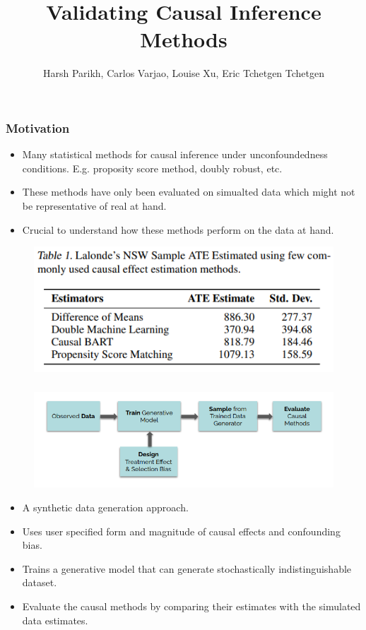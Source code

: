 \documentclass{beamer}
\begin{document}
\title[]{Validating Causal Inference Methods}
\author [] {Harsh Parikh, Carlos Varjao, Louise Xu, Eric Tchetgen Tchetgen}
\date{}
\maketitle

\begin{frame}
	\frametitle{Motivation}
	\begin{itemize}
		\item Many statistical methods for causal inference under unconfoundedness conditions. E.g. proposity score method, doubly robust, etc.
		\item These methods have only been evaluated on simualted data which might not be representative of real at hand.
		\item Crucial to understand how these methods perform on the data at hand.
	\end{itemize}
	\begin{figure}
		\includegraphics[scale=0.6]{imgs/comparison.png}
	\end{figure}
\end{frame}

\begin{frame}
	\frametitle{}
	\vspace{-2em}
	\begin{figure}
		\centering
		\includegraphics[scale=0.65]{imgs/flow.png}
	\end{figure}
	\vspace{-1.5em}
	\begin{itemize}
		\item A synthetic data generation approach.
		\item Uses user specified form and magnitude of causal effects
			and confounding bias.
		\item Trains a generative model that can generate
			stochastically indistinguishable dataset.
		\item Evaluate the causal methods by comparing their estimates
			with the simulated data estimates.
	\end{itemize}
\end{frame}
\end{document}
